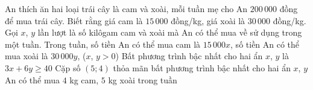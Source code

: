 \begin{ex}%
 	An thích ăn hai loại trái cây là cam và xoài, mỗi tuần mẹ cho An $200\,000$ đồng để mua trái cây. Biết rằng giá cam là $15\,000$ đồng/kg, giá xoài là $30\,000$ đồng/kg. Gọi $x$, $y$ lần lượt là số kilôgam cam và xoài mà An có thể mua về sử dụng trong một tuần.
 	\choiceTF 
 	{\True Trong tuần, số tiền An có thể mua cam là $15\,000x$, số tiền An có thể mua xoài là $30\,000 y$, ($x$, $y>0$)}
 	{Bất phương trình bậc nhất cho hai ẩn $x$, $y$ là $3 x+6 y \geq 40$}
 	{\True Cặp số $(5 ; 4)$ thỏa mãn bất phương trình bậc nhất cho hai ẩn $x$, $ y$}
 	{An có thể mua $4 $ kg cam, $5 $ kg xoài trong tuần}
 \end{ex}
